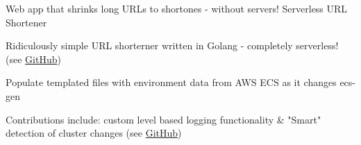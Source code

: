 

\begin{cventries}

  \cventry
    {Web app that shrinks long URLs to shortones - without servers!} %
    {Serverless URL Shortener}
    {}
    {}
    {
      \begin{cvitems} %
        \item {Ridiculously simple URL shorterner written in Golang - completely serverless! (see \href{https://github.com/michaelmcallister/serverless-url-shortener}{GitHub})}
      \end{cvitems}
    }

    \cventry
      {Populate templated files with environment data from AWS ECS as it changes} %
      {ecs-gen}
      {}
      {}
      {
        \begin{cvitems} %
          \item {Contributions include: custom level based logging functionality \& "Smart" detection of cluster changes (see \href{https://github.com/codesuki/ecs-gen}{GitHub})}
        \end{cvitems}
      }

\end{cventries}
